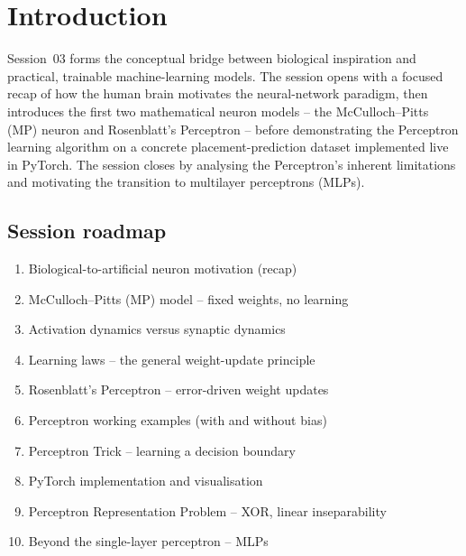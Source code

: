 \documentclass[12pt,a4paper]{article}
\begin{document}

\newpage

\section{Introduction}
\label{sec:intro}

Session~03 forms the conceptual bridge between biological inspiration
and practical, trainable machine-learning models.
The session opens with a focused recap of how the human brain motivates
the neural-network paradigm, then introduces the first two mathematical
neuron models -- the McCulloch--Pitts (MP) neuron and Rosenblatt's
Perceptron -- before demonstrating the Perceptron learning algorithm
on a concrete placement-prediction dataset implemented live in PyTorch.
The session closes by analysing the Perceptron's inherent limitations
and motivating the transition to multilayer perceptrons (MLPs).

\subsection*{Session roadmap}

\begin{enumerate}[label=\textbf{\arabic*.}]
  \item Biological-to-artificial neuron motivation (recap)
  \item McCulloch--Pitts (MP) model -- fixed weights, no learning
  \item Activation dynamics versus synaptic dynamics
  \item Learning laws -- the general weight-update principle
  \item Rosenblatt's Perceptron -- error-driven weight updates
  \item Perceptron working examples (with and without bias)
  \item Perceptron Trick -- learning a decision boundary
  \item PyTorch implementation and visualisation
  \item Perceptron Representation Problem -- XOR, linear inseparability
  \item Beyond the single-layer perceptron -- MLPs
\end{enumerate}
\end{document}
